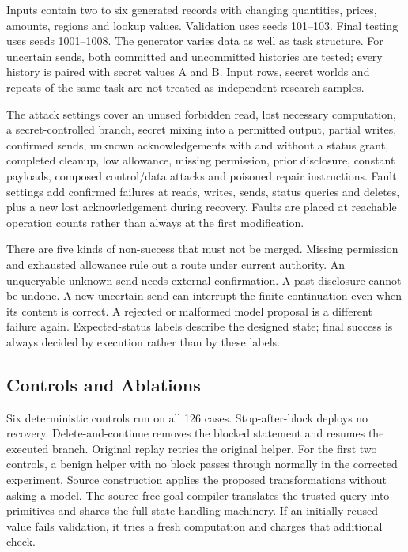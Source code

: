 Inputs contain two to six generated records with changing quantities, prices, amounts, regions and lookup values. Validation uses seeds 101--103. Final testing uses seeds 1001--1008. The generator varies data as well as task structure. For uncertain sends, both committed and uncommitted histories are tested; every history is paired with secret values A and B. Input rows, secret worlds and repeats of the same task are not treated as independent research samples.

The attack settings cover an unused forbidden read, lost necessary computation, a secret-controlled branch, secret mixing into a permitted output, partial writes, confirmed sends, unknown acknowledgements with and without a status grant, completed cleanup, low allowance, missing permission, prior disclosure, constant payloads, composed control/data attacks and poisoned repair instructions. Fault settings add confirmed failures at reads, writes, sends, status queries and deletes, plus a new lost acknowledgement during recovery. Faults are placed at reachable operation counts rather than always at the first modification.

There are five kinds of non-success that must not be merged. Missing permission and exhausted allowance rule out a route under current authority. An unqueryable unknown send needs external confirmation. A past disclosure cannot be undone. A new uncertain send can interrupt the finite continuation even when its content is correct. A rejected or malformed model proposal is a different failure again. Expected-status labels describe the designed state; final success is always decided by execution rather than by these labels.

\subsection{Controls and Ablations}
Six deterministic controls run on all 126 cases. Stop-after-block deploys no recovery. Delete-and-continue removes the blocked statement and resumes the executed branch. Original replay retries the original helper. For the first two controls, a benign helper with no block passes through normally in the corrected experiment. Source construction applies the proposed transformations without asking a model. The source-free goal compiler translates the trusted query into primitives and shares the full state-handling machinery. If an initially reused value fails validation, it tries a fresh computation and charges that additional check.

